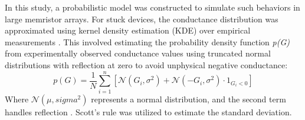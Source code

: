 


\noindent In this study, a probabilistic model was constructed to simulate such behaviors in large memristor arrays. For stuck devices, the conductance distribution was approximated using kernel density estimation (KDE) over empirical measurements \cite{turlach1993bandwidth}.  This involved estimating the probability density function \textit{p(G)} from experimentally observed conductance values using truncated normal distributions with reflection at zero to avoid unphysical negative conductance:
\begin{equation}
    p(G) = \frac{1}{N} \sum_{i=1}^{n} \left[ \mathcal{N}(G_i, \sigma ^2) + \mathcal{N}(-G_i, \sigma ^2) \cdot 1_{G_i < 0} \right] \label{eq:7.1}
\end{equation}
\noindent Where $\mathcal{N}(\mu, sigma^2)$ represents a normal distribution, and the second term handles reflection \cite{jones1993simple}. Scott's rule \cite{scott2015multivariate} was utilized to estimate the standard deviation.\\

